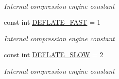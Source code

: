 \begin{DoxyCompactItemize}
$$\begin{DoxyCompactList}\small\item\em Internal compression engine constant \end{DoxyCompactList}\item 
const int \hyperlink{class_i_c_sharp_code_1_1_sharp_zip_lib_1_1_zip_1_1_compression_1_1_deflater_constants_a3cd5cf8162fba7e71e13c58def7533bf}{D\+E\+F\+L\+A\+T\+E\+\_\+\+F\+A\+ST} = 1
\begin{DoxyCompactList}\small\item\em Internal compression engine constant \end{DoxyCompactList}\item 
const int \hyperlink{class_i_c_sharp_code_1_1_sharp_zip_lib_1_1_zip_1_1_compression_1_1_deflater_constants_a2e63aad99752c46aba8428b90e8be7f9}{D\+E\+F\+L\+A\+T\+E\+\_\+\+S\+L\+OW} = 2
\begin{DoxyCompactList}\small\item\em Internal compression engine constant \end{DoxyCompactList}\end{DoxyCompactItemize}

